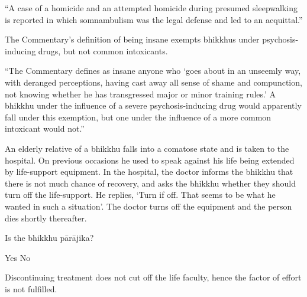 \begin{exam}{\autoExamName}
\begin{problem}
\begin{solution}
    ``A case of a homicide and an attempted homicide during presumed sleepwalking is reported in which somnambulism was the legal defense and led to an acquittal.''

    The Commentary's definition of being insane exempts bhikkhus under psychosis-inducing drugs, but not common intoxicants.

    ``The Commentary defines as insane anyone who `goes about in an unseemly way, with deranged perceptions, having cast away all sense of shame and compunction, not knowing whether he has transgressed major or minor training rules.'
    A bhikkhu under the influence of a severe psychosis-inducing drug would apparently fall under this exemption, but one under the influence of a more common intoxicant would not.''

  \end{solution}

\end{problem}

\problemDivide

\begin{problem}

  An elderly relative of a bhikkhu falls into a comatose state and is taken to the hospital.
  On previous occasions he used to speak against his life being extended by life-support equipment.
  In the hospital, the doctor informs the bhikkhu that there is not much chance of recovery, and asks the bhikkhu whether they should turn off the life-support.
  He replies, `Turn if off. That seems to be what he wanted in such a situation'.
  The doctor turns off the equipment and the person dies shortly thereafter.

  \bigskip

  Is the bhikkhu pārājika?

  \begin{answers}{2}
    \bChoices
     Yes\eAns
     No\eAns
    \eChoices
  \end{answers}

  \begin{solution}
    Discontinuing treatment does not cut off the life faculty, hence the factor of effort is not fulfilled.
  \end{solution}

\end{problem}

\ifnosolutions
\problemDivide
\else
\clearpage
\fi

\begin{problem}


\end{problem}
\end{exam}

